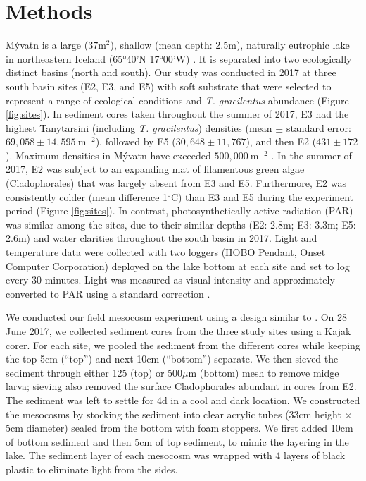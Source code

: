 

\section*{Methods}


M\'{y}vatn is a large ($37\text{m}^2$), shallow (mean depth: 2.5m), 
naturally eutrophic lake in northeastern Iceland (65°40’N 17°00’W) \citep{einarsson2004}.
It is separated into two ecologically distinct basins (north and south).
Our study was conducted in 2017 at three south basin sites (E2, E3, and E5) 
with soft substrate that were selected to represent a range of ecological conditions 
and \emph{T. gracilentus} abundance (Figure \ref{fig:sites}).
In sediment cores taken throughout the summer of 2017, E3 
had the highest Tanytarsini (including \emph{T. gracilentus}) densities 
(mean $\pm$ standard error: $69,058 \pm 14,595~\text{m}^{-2}$),
followed by E5 ($30,648 \pm 11,767$), and then E2 ($431 \pm 172$).
Maximum densities in M\'{y}vatn have exceeded $500,000~\text{m}^{-2}$ 
\citep{thorbergsdottir2004}.
In the summer of 2017, 
E2 was subject to an expanding mat of filamentous green algae (Cladophorales) 
that was largely absent from E3 and E5.
Furthermore, E2 was consistently colder (mean difference 1$^{\circ}$C) 
than E3 and E5 during the experiment period (Figure \ref{fig:sites}).
In contrast, photosynthetically active radiation (PAR) was similar among the sites,
due to their similar depths (E2: 2.8m; E3: 3.3m; E5: 2.6m)
and water clarities throughout the south basin in 2017.
Light and temperature data were collected with two loggers 
(HOBO Pendant, Onset Computer Corporation) deployed on the lake bottom at each site
and set to log every 30 minutes.
Light was measured as visual intensity
and approximately converted to PAR using a standard correction \citep{thimijan1983}.

We conducted our field mesocosm experiment using a design
similar to \cite{phillips2019}.
On 28 June 2017, we collected sediment cores from the three study sites using a Kajak corer. 
For each site, we pooled the sediment from the different cores while keeping the 
top 5cm (``top'') and next 10cm (``bottom'') separate.
We then sieved the sediment through either 125 (top) or 500$\mu \text{m}$ (bottom) mesh
to remove midge larva; 
sieving also removed the surface Cladophorales abundant in cores from E2.
The sediment was left to settle for 4d in a cool and dark location.
We constructed the mesocosms by stocking the sediment into 
clear acrylic tubes (33cm height $\times$ 5cm diameter) 
sealed from the bottom with foam stoppers.
We first added 10cm of bottom sediment and then 5cm of top sediment, 
to mimic the layering in the lake.
The sediment layer of each mesocosm was wrapped with 4 layers of black plastic
to eliminate light from the sides.


